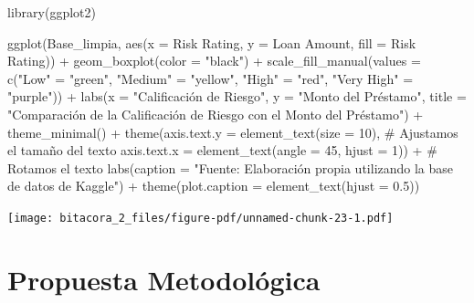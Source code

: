 \documentclass[
  letterpaper,
  DIV=11,
  numbers=noendperiod]{scrreprt}
\newenvironment{Shaded}{\begin{snugshade}}{\end{snugshade}}
\newcommand{\AttributeTok}[1]{\textcolor[rgb]{0.40,0.45,0.13}{#1}}
\newcommand{\CommentTok}[1]{\textcolor[rgb]{0.37,0.37,0.37}{#1}}
\newcommand{\DecValTok}[1]{\textcolor[rgb]{0.68,0.00,0.00}{#1}}
\newcommand{\FloatTok}[1]{\textcolor[rgb]{0.68,0.00,0.00}{#1}}
\newcommand{\FunctionTok}[1]{\textcolor[rgb]{0.28,0.35,0.67}{#1}}
\newcommand{\NormalTok}[1]{\textcolor[rgb]{0.00,0.23,0.31}{#1}}
\newcommand{\OtherTok}[1]{\textcolor[rgb]{0.00,0.23,0.31}{#1}}
\newcommand{\SpecialCharTok}[1]{\textcolor[rgb]{0.37,0.37,0.37}{#1}}
\newcommand{\StringTok}[1]{\textcolor[rgb]{0.13,0.47,0.30}{#1}}
\begin{document}
\begin{Shaded}
\begin{Highlighting}[]
\FunctionTok{library}\NormalTok{(ggplot2)}

\FunctionTok{ggplot}\NormalTok{(Base\_limpia, }\FunctionTok{aes}\NormalTok{(}\AttributeTok{x =} \StringTok{\textasciigrave{}}\AttributeTok{Risk Rating}\StringTok{\textasciigrave{}}\NormalTok{, }\AttributeTok{y =} \StringTok{\textasciigrave{}}\AttributeTok{Loan Amount}\StringTok{\textasciigrave{}}\NormalTok{, }\AttributeTok{fill =} \StringTok{\textasciigrave{}}\AttributeTok{Risk Rating}\StringTok{\textasciigrave{}}\NormalTok{)) }\SpecialCharTok{+}  
  \FunctionTok{geom\_boxplot}\NormalTok{(}\AttributeTok{color =} \StringTok{"black"}\NormalTok{) }\SpecialCharTok{+}  
  \FunctionTok{scale\_fill\_manual}\NormalTok{(}\AttributeTok{values =} \FunctionTok{c}\NormalTok{(}\StringTok{"Low"} \OtherTok{=} \StringTok{"green"}\NormalTok{, }\StringTok{"Medium"} \OtherTok{=} \StringTok{"yellow"}\NormalTok{, }\StringTok{"High"} \OtherTok{=} \StringTok{"red"}\NormalTok{, }\StringTok{"Very High"} \OtherTok{=} \StringTok{"purple"}\NormalTok{)) }\SpecialCharTok{+}  
  \FunctionTok{labs}\NormalTok{(}\AttributeTok{x =} \StringTok{"Calificación de Riesgo"}\NormalTok{, }\AttributeTok{y =} \StringTok{"Monto del Préstamo"}\NormalTok{, }\AttributeTok{title =} \StringTok{"Comparación de la Calificación de Riesgo con el Monto del Préstamo"}\NormalTok{) }\SpecialCharTok{+} 
  \FunctionTok{theme\_minimal}\NormalTok{() }\SpecialCharTok{+}
  \FunctionTok{theme}\NormalTok{(}\AttributeTok{axis.text.y =} \FunctionTok{element\_text}\NormalTok{(}\AttributeTok{size =} \DecValTok{10}\NormalTok{), }\CommentTok{\# Ajustamos el tamaño del texto}
        \AttributeTok{axis.text.x =} \FunctionTok{element\_text}\NormalTok{(}\AttributeTok{angle =} \DecValTok{45}\NormalTok{, }\AttributeTok{hjust =} \DecValTok{1}\NormalTok{))  }\SpecialCharTok{+} \CommentTok{\# Rotamos el texto }
\FunctionTok{labs}\NormalTok{(}\AttributeTok{caption =} \StringTok{"Fuente: Elaboración propia utilizando la base de datos de Kaggle"}\NormalTok{) }\SpecialCharTok{+}
\FunctionTok{theme}\NormalTok{(}\AttributeTok{plot.caption =} \FunctionTok{element\_text}\NormalTok{(}\AttributeTok{hjust =} \FloatTok{0.5}\NormalTok{)) }
\end{Highlighting}
\end{Shaded}

\texttt{[image: bitacora\_2\_files/figure-pdf/unnamed-chunk-23-1.pdf]}

\section{Propuesta Metodológica}\label{propuesta-metodoluxf3gica}
\end{document}
